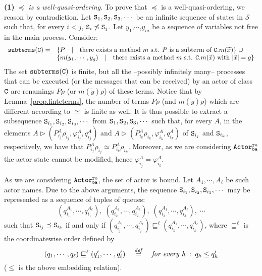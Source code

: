 \documentclass{LMCS}
\newcommand{\cal}{\mathcal}
\theoremstyle{plain}\newtheorem{proposition}[thm]{Proposition}
\theoremstyle{plain}\newtheorem{lemma}[thm]{Lemma}
\theoremstyle{plain}\newtheorem{theorem}[thm]{Theorem}
\theoremstyle{plain}\newtheorem{corollary}[thm]{Corollary}
\newif\ifconf \conffalse
\newcommand{\State}{{\tt S}}
\newcommand{\eqdef}{\stackrel{{\it def}}{=}}
\newcommand{\wt}[1]{\widetilde{#1}}
\newcommand{\adef}[1]{{\tt #1}}
\newcommand{\actroba}{${\tt Actor^{\tt ro}_{\tt ba}}$}
\begin{document}
\ifconf
\else
\proof
{\bf (1)} \emph{$\preceq$ is a well-quasi-ordering}. 
To prove that $\preceq$ is a well-quasi-ordering, we reason by contradiction.
Let $\State_1, \State_2, \State_3, \cdots$ be 
an infinite sequence of states in ${\cal S}$ such that, for every $i < j$,  $\State_i \not \preceq 
\State_j$. 
Let $y_1$,$\cdots$,$y_m$ be a sequence of variables not free in the main process.
Consider:
\[
\begin{array}{ll}
{\tt subterms}(\adef{C}) = &
\{ P \quad | \quad \mbox{there exists a method } m \mbox{ s.t. }
P \mbox{ is a subterm of } \adef{C}.m(\wt{x})\}\ \cup
\\
& 
\{m(y_1, \cdots ,y_g)\quad | \quad
\mbox{there exists a method } m \mbox{ s.t. }
\adef{C}.m(\wt{x}) \mbox{ with  $|\wt{x}|=g$} \}
\end{array}
\]
The set ${\tt subterms}(\adef{C})$ is finite, but all the --possibly infinitely many-- processes
that can be executed
(or the messages that can be received)  
by an actor of class $\adef{C}$ are renamings $P\rho$ (or $m(\wt{y}) \rho$) 
of these terms.
Notice that by Lemma~\ref{prop.finteterms}, the number of terms $P \rho$ 
(and $m(\wt{y}) \rho$) which are different 
according to $\simeq$ is finite as well. 
It is thus possible to extract 
a subsequence $\State_{i_1}, \State_{i_2}, \State_{i_3}, \cdots$ from 
$\State_1, \State_2, \State_3, \cdots$ such that, for every $A$, in the
elements $A \triangleright (P_{i_j}^A \rho_{i_j}, \varphi_{i_j}^A, q_{i_j}^A)$ and $A \triangleright (P_{i_k}^A\rho_{i_k}, \varphi_{i_k}^A, q_{i_k}^A)$
of $\State_{i_j}$ and $\State_{i_k}$, respectively, we have that $P_{i_j}^A\rho_{i_j} \simeq
P_{i_k}^A\rho_{i_k}$. Moreover, as we are considering {\actroba} the actor state cannot
be modified, hence $\varphi_{i_j}^A=\varphi_{i_k}^A$.

As we are considering {\actroba}, the set of actor is bound.
Let ${A_1}, \cdots , {A_\ell}$ be such actor names.
Due to the above arguments, the sequence $\State_{i_1}, \State_{i_2}, 
\State_{i_3}, \cdots$ may be represented as a sequence of tuples
of queues:
\[
(q_{i_1}^{A_1}, \cdots , q_{i_1}^{A_\ell}), \;
(q_{i_2}^{A_1}, \cdots , q_{i_2}^{A_\ell}),\;
(q_{i_3}^{A_1}, \cdots , q_{i_3}^{A_\ell}),\; \cdots
\]
such that $\State_{i_j} \preceq \State_{i_k}$ if and only if 
$(q_{i_j}^{A_1}, \cdots , q_{i_j}^{A_\ell}) \sqsubseteq^\ell
(q_{i_k}^{A_1}, \cdots , q_{i_k}^{A_\ell})$, where $\sqsubseteq^\ell$ is the 
coordinatewise order defined by
\[
(q_1, \cdots , q_\ell) \sqsubseteq^\ell
(q_1', \cdots , q_\ell') \quad \eqdef \quad 
\mbox{{\em for every h}} \; : \; q_h \leq q_h'
\]
($\leq$ is the above embedding relation).
\end{document}
